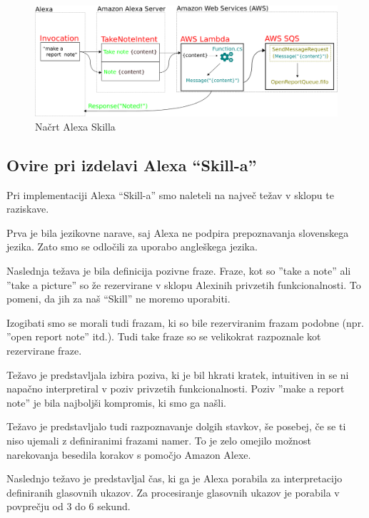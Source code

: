 \documentclass[a4paper, 12pt]{book}
\begin{document}
\begin{figure}[H]
\begin{center}
\includegraphics[width=13.5cm]{skill_2}
\end{center}
\caption{Načrt Alexa Skilla}
\label{skill}
\end{figure}

\subsection{Ovire pri izdelavi Alexa \enquote{Skill-a}}

Pri implementaciji Alexa \enquote{Skill-a} smo naleteli na največ težav v sklopu te raziskave.

Prva je bila jezikovne narave, saj Alexa ne podpira prepoznavanja slovenskega jezika.
Zato smo se odločili za uporabo angleškega jezika.

Naslednja težava je bila definicija pozivne fraze.
Fraze, kot so ''take a note'' ali ''take a picture'' so že rezervirane v sklopu Alexinih privzetih funkcionalnosti.
To pomeni, da jih za naš \enquote{Skill} ne moremo uporabiti.

Izogibati smo se morali tudi frazam, ki so bile rezerviranim frazam podobne (npr. ''open report note'' itd.).
Tudi take fraze so se velikokrat razpoznale kot rezervirane fraze.

Težavo je predstavljala izbira poziva, ki je bil hkrati kratek, intuitiven in se ni napačno interpretiral v poziv privzetih funkcionalnosti.
Poziv ''make a report note'' je bila najboljši kompromis, ki smo ga našli.

Težavo je predstavljalo tudi razpoznavanje dolgih stavkov, še posebej, če se ti niso ujemali z definiranimi frazami namer.
To je zelo omejilo možnost narekovanja besedila korakov s pomočjo Amazon Alexe.

Naslednjo težavo je predstavljal čas, ki ga je Alexa porabila za interpretacijo definiranih glasovnih ukazov.
Za procesiranje glasovnih ukazov je porabila v povprečju od 3 do 6 sekund.
\end{document}
